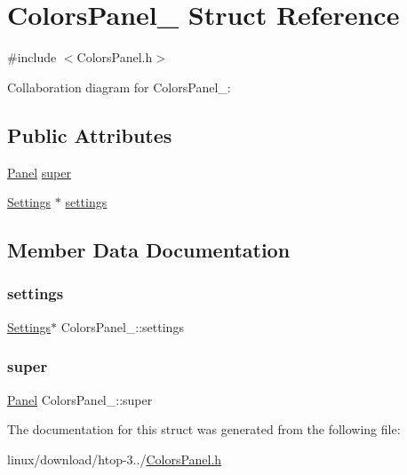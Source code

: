 \hypertarget{structColorsPanel__}{}\section{Colors\+Panel\+\_\+ Struct Reference}
\label{structColorsPanel__}


{\ttfamily \#include $<$Colors\+Panel.\+h$>$}



Collaboration diagram for Colors\+Panel\+\_\+\+:
\subsection*{Public Attributes}
\begin{DoxyCompactItemize}
\item 
\hyperlink{Panel_8h_a034d4c16521db412dc7a1e8536d16fae}{Panel} \hyperlink{structColorsPanel___aae70abf744dcc07dc63a6cfb8ed9eeff}{super}
\item 
\hyperlink{Settings_8h_ad97e5960b63f21c02bf5e0e43c0ef002}{Settings} $\ast$ \hyperlink{structColorsPanel___a08c22ae3b3e51b44ca3d105a1dcfe562}{settings}
\end{DoxyCompactItemize}


\subsection{Member Data Documentation}
\mbox{\label{structColorsPanel___a08c22ae3b3e51b44ca3d105a1dcfe562}} 
\subsubsection{\texorpdfstring{settings}{settings}}
{\footnotesize\ttfamily \hyperlink{Settings_8h_ad97e5960b63f21c02bf5e0e43c0ef002}{Settings}$\ast$ Colors\+Panel\+\_\+\+::settings}

\mbox{\label{structColorsPanel___aae70abf744dcc07dc63a6cfb8ed9eeff}} 
\subsubsection{\texorpdfstring{super}{super}}
{\footnotesize\ttfamily \hyperlink{Panel_8h_a034d4c16521db412dc7a1e8536d16fae}{Panel} Colors\+Panel\+\_\+\+::super}



The documentation for this struct was generated from the following file\+:\begin{DoxyCompactItemize}
\item 
linux/download/htop-\/3../\hyperlink{ColorsPanel_8h}{Colors\+Panel.\+h}\end{DoxyCompactItemize}
